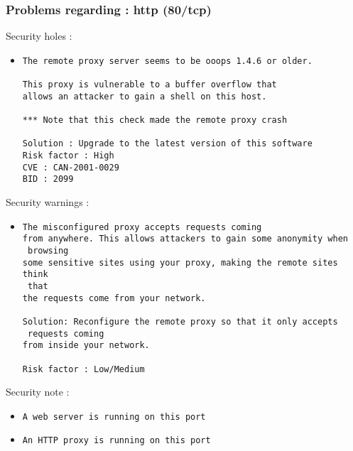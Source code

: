 \documentclass{article}
\begin{document}
\subsubsection{Problems regarding : http (80/tcp)}
Security holes :\\
\begin{itemize}
\item \begin{verbatim}
The remote proxy server seems to be ooops 1.4.6 or older.

This proxy is vulnerable to a buffer overflow that
allows an attacker to gain a shell on this host.

*** Note that this check made the remote proxy crash

Solution : Upgrade to the latest version of this software
Risk factor : High
CVE : CAN-2001-0029
BID : 2099
\end{verbatim}\end{itemize}
Security warnings :\\
\begin{itemize}
\item \begin{verbatim}
The misconfigured proxy accepts requests coming
from anywhere. This allows attackers to gain some anonymity when
 browsing 
some sensitive sites using your proxy, making the remote sites think
 that
the requests come from your network.

Solution: Reconfigure the remote proxy so that it only accepts
 requests coming 
from inside your network.
 
Risk factor : Low/Medium
\end{verbatim}\end{itemize}
Security note :\\
\begin{itemize}
\item \begin{verbatim}
A web server is running on this port
\end{verbatim}\item \begin{verbatim}
An HTTP proxy is running on this port
\end{verbatim}\end{itemize}
\end{document}
